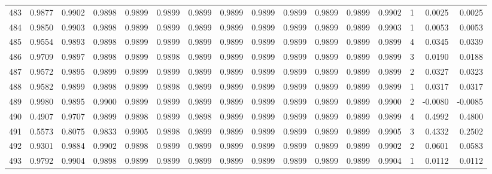 \begin{tabular}{lrrrrrrrrrrrrrrr}
483 &      0.9877 &  0.9902 &  0.9898 &  0.9899 &  0.9899 &  0.9899 &  0.9899 &  0.9899 &  0.9899 &  0.9899 &   0.9899 &     0.9902 &      1 &                    0.0025 &                     0.0025 \\
484 &      0.9850 &  0.9903 &  0.9898 &  0.9899 &  0.9899 &  0.9899 &  0.9899 &  0.9899 &  0.9899 &  0.9899 &   0.9899 &     0.9903 &      1 &                    0.0053 &                     0.0053 \\
485 &      0.9554 &  0.9893 &  0.9898 &  0.9899 &  0.9899 &  0.9899 &  0.9899 &  0.9899 &  0.9899 &  0.9899 &   0.9899 &     0.9899 &      4 &                    0.0345 &                     0.0339 \\
486 &      0.9709 &  0.9897 &  0.9898 &  0.9899 &  0.9898 &  0.9899 &  0.9899 &  0.9899 &  0.9899 &  0.9899 &   0.9899 &     0.9899 &      3 &                    0.0190 &                     0.0188 \\
487 &      0.9572 &  0.9895 &  0.9899 &  0.9899 &  0.9899 &  0.9899 &  0.9899 &  0.9899 &  0.9899 &  0.9899 &   0.9899 &     0.9899 &      2 &                    0.0327 &                     0.0323 \\
488 &      0.9582 &  0.9899 &  0.9898 &  0.9899 &  0.9898 &  0.9899 &  0.9899 &  0.9899 &  0.9899 &  0.9899 &   0.9899 &     0.9899 &      1 &                    0.0317 &                     0.0317 \\
489 &      0.9980 &  0.9895 &  0.9900 &  0.9899 &  0.9899 &  0.9899 &  0.9899 &  0.9899 &  0.9899 &  0.9899 &   0.9899 &     0.9900 &      2 &                   -0.0080 &                    -0.0085 \\
490 &      0.4907 &  0.9707 &  0.9899 &  0.9898 &  0.9899 &  0.9898 &  0.9899 &  0.9899 &  0.9899 &  0.9899 &   0.9899 &     0.9899 &      4 &                    0.4992 &                     0.4800 \\
491 &      0.5573 &  0.8075 &  0.9833 &  0.9905 &  0.9898 &  0.9899 &  0.9899 &  0.9899 &  0.9899 &  0.9899 &   0.9899 &     0.9905 &      3 &                    0.4332 &                     0.2502 \\
492 &      0.9301 &  0.9884 &  0.9902 &  0.9898 &  0.9899 &  0.9899 &  0.9899 &  0.9899 &  0.9899 &  0.9899 &   0.9899 &     0.9902 &      2 &                    0.0601 &                     0.0583 \\
493 &      0.9792 &  0.9904 &  0.9898 &  0.9899 &  0.9899 &  0.9899 &  0.9899 &  0.9899 &  0.9899 &  0.9899 &   0.9899 &     0.9904 &      1 &                    0.0112 &                     0.0112 \\

\end{tabular}
